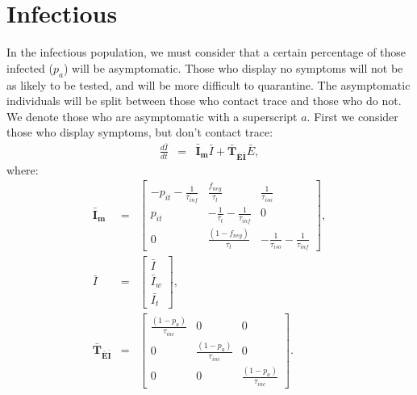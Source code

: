 \documentclass{article}
\begin{document}


\section{Infectious}
In the infectious population, we must consider that a certain percentage of those infected ($p_{a}$) will be asymptomatic. Those who display no symptoms will not be as likely to be tested, and will be more difficult to quarantine. The asymptomatic individuals will be split between those who contact trace and those who do not. We denote those who are asymptomatic with a superscript $a$. First we consider those who display symptoms, but don't contact trace:
\begin{eqnarray}
\frac{d\bar{I}}{dt} &=& \boldsymbol{\bar{I}_{m}}  \bar{I} + \boldsymbol{\bar{T}_{\bar{E}\bar{I}}}  \bar{E}, 
\end{eqnarray}
where:
%
\begin{eqnarray}
\boldsymbol{\bar{I}_{m}} &=&
\begin{bmatrix}
- p_{it} -\frac{1}{\tau_{inf}}  &  \frac{f_{neg}}{\tau_{t}}            & \frac{1}{\tau_{iso}} \\ 
 p_{it}              & -\frac{1}{\tau_{t}} -\frac{1}{\tau_{inf}}       & 0  \\ 
 0                  & \frac{(1- f_{neg})}{\tau_{t}}                        & -\frac{1}{\tau_{iso}} -\frac{1}{\tau_{inf}}
\end{bmatrix}, \\ 
%
\bar{I} &=& 
\begin{bmatrix}
\bar{I} \\ \bar{I}_{w}\\ \bar{I_{t}}
\end{bmatrix}, \\ 
%
\boldsymbol{\bar{T}_{\bar{E}\bar{I}}} &=&
\begin{bmatrix}
\frac{(1-p_{a})}{\tau_{inc}}  & 0                 & 0 \\ 
 0          &  \frac{(1-p_{a})}{\tau_{inc}}  & 0 \\ 
 0          & 0                 &  \frac{(1-p_{a})}{\tau_{inc}} 
\end{bmatrix}.
%
\end{eqnarray}
\end{document}
